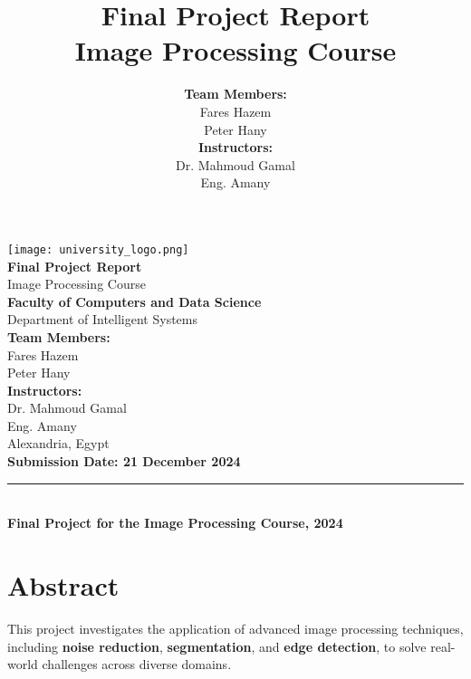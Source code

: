 \documentclass[12pt,a4paper]{article}
\title{\Huge \textbf{Final Project Report} \\ \vspace{0.5cm} \Large Image Processing Course}
\author{
    \Large \textbf{Team Members:} \\ 
    \large Fares Hazem \\ 
    \large Peter Hany \\ 
    \vspace{0.5cm} 
    \Large \textbf{Instructors:} \\ 
    \large Dr. Mahmoud Gamal \\ 
    \large Eng. Amany %
}
\date{} %
\begin{document}
\begin{titlepage}
    \centering
    \texttt{[image: university\_logo.png]} \\[1cm]
    
    {\Huge \textbf{Final Project Report}} \\[0.5cm]
    {\Large Image Processing Course} \\[1cm]

    {\Large \textbf{Faculty of Computers and Data Science}} \\[0.3cm]
    {\Large Department of Intelligent Systems} \\[1.5cm]

    {\Large \textbf{Team Members:}} \\[0.3cm]
    {\large Fares Hazem} \\ [0.3cm] 
    {\large Peter Hany} \\[1cm]
    
    {\Large \textbf{Instructors:}} \\[0.3cm]
    {\large Dr. Mahmoud Gamal} \\[0.3cm]  %
    {\large Eng. Amany} \\[1.5cm]  %
    
    {\Large Alexandria, Egypt} \\[0.3cm]
    {\large \textbf{Submission Date: 21 December 2024}} \\

    \vfill
    \rule{0.8\textwidth}{0.5pt} \\[0.2cm]
    {\small \textbf{Final Project for the Image Processing Course, 2024}}
\end{titlepage}




\newpage %
\section*{\centering Abstract}


This project investigates the application of advanced image processing techniques, including \textbf{noise reduction}, \textbf{segmentation}, and \textbf{edge detection}, to solve real-world challenges across diverse domains. 
\end{document}
